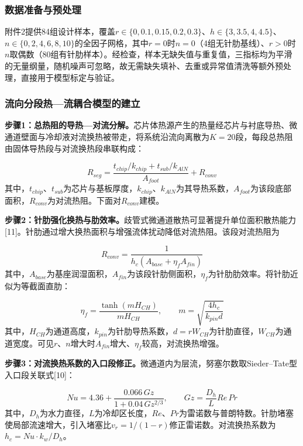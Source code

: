 \documentclass[withoutpreface]{cumcmthesis}
\begin{document}
\subsubsection{数据准备与预处理}
附件2提供84组设计样本，覆盖$r\in\{0,0.1,0.15,0.2,0.3\}$、$h\in\{3,3.5,4,4.5\}$、$n\in\{0,2,4,6,8,10\}$的全因子网格，其中$r=0$时$n=0$（4组无针肋基线）、$r>0$时$n$取偶数（80组有针肋样本）。经检查，样本无缺失值与重复值，三指标均为平滑的无量纲量，随机噪声可忽略，故无需缺失填补、去重或异常值清洗等额外预处理，直接用于模型标定与验证。

\subsubsection{流向分段热—流耦合模型的建立}
\textbf{步骤1：总热阻的导热—对流分解。}芯片体热源产生的热量经芯片与衬底导热、微通道壁面与冷却液对流换热被带走，将系统沿流向离散为$K=20$段，每段总热阻由固体导热段与对流换热段串联构成：

\begin{equation}
R_{seg}=\frac{t_{chip}/k_{chip}+t_{sub}/k_{AlN}}{A_{foot}}+R_{conv} \tag{1}
\end{equation}
其中，$t_{chip}$、$t_{sub}$为芯片与基板厚度，$k_{chip}$、$k_{AlN}$为其导热系数，$A_{foot}$为该段底部面积，$R_{conv}$为对流热阻。下面对$R_{conv}$建模。

\textbf{步骤2：针肋强化换热与肋效率。}歧管式微通道散热可显著提升单位面积散热能力[11]。针肋通过增大换热面积与增强流体扰动降低对流热阻。该段对流热阻为

\begin{equation}
R_{conv}=\frac{1}{h_c\left(A_{base}+\eta_f A_{fin}\right)} \tag{2}
\end{equation}
其中，$A_{base}$为基座润湿面积，$A_{fin}$为该段针肋侧面积，$\eta_f$为针肋肋效率。将针肋近似为等截面直肋：

\begin{equation}
\eta_f=\frac{\tanh(mH_{CH})}{mH_{CH}},\qquad m=\sqrt{\frac{4h_c}{k_{pin}d}} \tag{3}
\end{equation}
其中，$H_{CH}$为通道高度，$k_{pin}$为针肋导热系数，$d=rW_{CH}$为针肋直径，$W_{CH}$为通道宽度。可见$r$、$n$增大时$A_{fin}$增大、$\eta_f$较高，对流换热增强。

\textbf{步骤3：对流换热系数的入口段修正。}微通道内为层流，努塞尔数取Sieder–Tate型入口段关联式[10]：

\begin{equation}
Nu=4.36+\frac{0.066\,Gz}{1+0.04\,Gz^{2/3}},\qquad Gz=\frac{D_h}{L}Re\,Pr \tag{4}
\end{equation}
其中，$D_h$为水力直径，$L$为冷却区长度，$Re$、$Pr$为雷诺数与普朗特数。针肋堵塞使局部流速增大，引入堵塞比$v_r=1/(1-r)$修正雷诺数。对流换热系数为$h_c=Nu\cdot k_w/D_h$。
\end{document}
